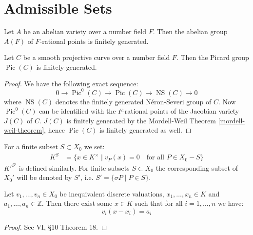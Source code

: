 \section{Admissible Sets}

\begin{theorem}\label{mordell-weil-theorem}
Let $A$ be an abelian variety over a number field $F$. Then the abelian group $A(F)$ of $F$-rational points is finitely generated.
\end{theorem}

\begin{corollary}\label{mordell-weil-corollary}
Let $C$ be a smooth projective curve over a number field $F$. Then the Picard group $\operatorname{Pic}(C)$ is finitely generated.
\end{corollary}

\begin{proof}
We have the following exact sequence:
\[ 0\longrightarrow \operatorname{Pic}^0(C) \longrightarrow\operatorname{Pic}(C) \longrightarrow \operatorname{NS}(C) \longrightarrow 0  \]
where $\operatorname{NS}(C)$ denotes the finitely generated Néron-Severi group of $C$. Now $\operatorname{Pic}^0(C)$ can be identified with the $F$-rational points of the Jacobian variety $J(C)$ of $C$. $J(C)$ is finitely generated by the Mordell-Weil Theorem \ref{mordell-weil-theorem}, hence $\operatorname{Pic}(C)$ is finitely generated as well.
\end{proof}

\begin{definition}\label{4.4}
For a finite subset $S\subset X_0$ we set:
\begin{align*}
K^S &= \{ x\in K^\times \mid v_P(x)=0\quad\text{for all }P\in X_0-S \}
\end{align*}
$K'^{S'}$ is defined similarly. For finite subsets $S\subset X_0$ the corresponding subset of $X_0'$ will be denoted by $S'$, i.e. $S'=\{\sigma P\mid P\in S \} $.
\end{definition}

\begin{theorem}\label{weak-approximation}
Let $v_1,\ldots,v_n\in X_0$ be inequivalent discrete valuations, $x_1,\ldots,x_n\in K$ and $a_1,\ldots,a_n\in\mathbb{Z}$. Then there exist some $x\in K$ such that for all $i=1,\ldots,n$ we have:
\[ v_i(x-x_i) = a_i \]
\end{theorem}

\begin{proof}
See \cite{ZS60} VI, §10 Theorem 18.
\end{proof}


